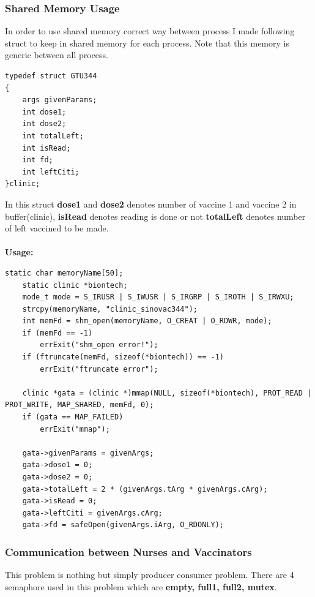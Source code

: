 \documentclass{article}
\begin{document}
\subsubsection{Shared Memory Usage}
In order to use shared memory correct way between process I made following struct to keep in shared memory for each process.
Note that this memory is generic between all process.
\begin{lstlisting}[style=CStyle]
typedef struct GTU344
{
    args givenParams;
    int dose1;
    int dose2;
    int totalLeft;
    int isRead;
    int fd;
    int leftCiti;
}clinic;
\end{lstlisting}
In this struct \textbf{dose1} and \textbf{dose2} denotes number of vaccine 1 and vaccine 2 in buffer(clinic), 
\textbf{isRead} denotes reading is done or not \textbf{totalLeft} denotes number of 
left vaccined to be made.\\ \\
\cleardoublepage
\textbf{Usage:}
\begin{lstlisting}[style=CStyle]
    static char memoryName[50];
    static clinic *biontech;
    mode_t mode = S_IRUSR | S_IWUSR | S_IRGRP | S_IROTH | S_IRWXU;
    strcpy(memoryName, "clinic_sinovac344");
    int memFd = shm_open(memoryName, O_CREAT | O_RDWR, mode);
    if (memFd == -1)
        errExit("shm_open error!");
    if (ftruncate(memFd, sizeof(*biontech)) == -1)
        errExit("ftruncate error");

    clinic *gata = (clinic *)mmap(NULL, sizeof(*biontech), PROT_READ | PROT_WRITE, MAP_SHARED, memFd, 0);
    if (gata == MAP_FAILED)
        errExit("mmap");

    gata->givenParams = givenArgs;
    gata->dose1 = 0;
    gata->dose2 = 0;
    gata->totalLeft = 2 * (givenArgs.tArg * givenArgs.cArg);
    gata->isRead = 0;
    gata->leftCiti = givenArgs.cArg;
    gata->fd = safeOpen(givenArgs.iArg, O_RDONLY);
\end{lstlisting}
\subsubsection{Communication between Nurses and Vaccinators}
This problem is nothing but simply producer consumer problem. There are 4 semaphore used in this problem which are
\textbf{empty, full1, full2, mutex}.
\end{document}
